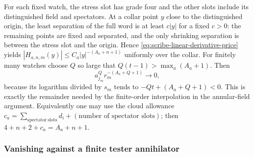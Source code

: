 For each fixed watch, the stress slot has grade four and the other
slots include its distinguished field and spectators. At a collar
point $y$ close to the distinguished origin, the least separation of
the full word is at least $c|y|$ for a fixed $c>0$: the remaining
points are fixed and separated, and the only shrinking separation is
between the stress slot and the origin. Hence
\eqref{eq:scribe-linear-derivative-price} yields
$|H_{a,n,m}(y)|\le C_a|y|^{-(A_a+n+1)}$ uniformly over the collar.
For finitely many watches choose $Q$ so large that
$Q(t-1)>\max_a(A_a+1)$. Then
\[
 a_{j_m}^Q r_m^{-(A_a+Q+1)}\longrightarrow0,
\]
because its logarithm divided by $s_m$ tends to
$-Qt+(A_a+Q+1)<0$. This is exactly the remainder needed by the
finite-order interpolation in the annular-field argument. Equivalently
one may use the cloud allowance
$c_a=\sum_{\mathrm{spectator\ slots}}d_i+
       (\text{number of spectator slots})$;
then $4+n+2+c_a=A_a+n+1$.

\subsubsection{Vanishing against a finite tester annihilator}

